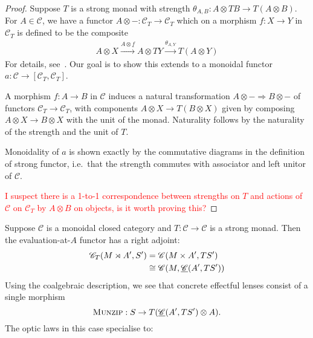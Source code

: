 \documentclass[11pt,letterpaper]{article}
\theoremstyle{plain}
\theoremstyle{definition}
\newcommand{\C}{\mathscr{C}}
\newcommand{\homC}{\underline{\C}}
\newcommand{\munzip}{\textsc{Munzip}}
\newcommand{\todo}[1]{\textcolor{red}{\small #1}}
\begin{document}
\begin{proof}
Suppose $T$ is a strong monad with strength $\theta_{A, B} : A \otimes T B \to T(A \otimes B)$. For $A \in \C$, we have a functor $A \otimes - : \C_T \to \C_T$ which on a morphism $f : X \to Y$ in $\C_T$ is defined to be the composite
\begin{align*}
A \otimes X \xrightarrow{A \otimes \underline{f}} A \otimes TY \xrightarrow{\theta_{A, Y}} T(A \otimes Y)
\end{align*}
For details, see~\cite[Theorem 4.2]{PremonoidalCategories}. Our goal is to show this extends to a monoidal functor $a : \C \to [\C_T, \C_T]$.

A morphism $f : A \to B$ in $\C$ induces a natural transformation $A \otimes - \Rightarrow B \otimes -$ of functors $\C_T \to \C_T$, with components $A \otimes X \to T(B \otimes X)$ given by composing $A \otimes X \to B \otimes X$ with the unit of the monad. Naturality follows by the naturality of the strength and the unit of $T$.

Monoidality of $a$ is shown exactly by the commutative diagrams in the definition of strong functor, i.e.\ that the strength commutes with associator and left unitor of $\C$.

\todo{I suspect there is a 1-to-1 correspondence between strengths on $T$ and actions of $\C$ on $\C_T$ by $A \otimes B$ on objects, is it worth proving this?}
\end{proof}

Suppose $\C$ is a monoidal closed category and $T : \C \to \C$ is a strong monad. Then the evaluation-at-$A$ functor has a right adjoint:
\begin{align*}
\C_T(M \monact A', S') 
&= \C(M \times A', T S') \\
&\cong \C(M, \homC(A', T S'))
\end{align*}
Using the coalgebraic description, we see that concrete effectful lenses consist of a single morphism \[\munzip : S \to T(\homC(A', T S') \otimes A).\] The optic laws in this case specialise to:
\end{document}
